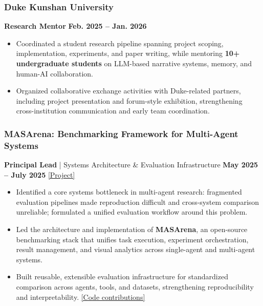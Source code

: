 \documentclass[10pt,a4paper]{article}
\begin{document}
    \subsubsection*{\color{itemcolor}Duke Kunshan University}
    \noindent\textbf{\color{sectioncolor}Research Mentor} \hfill \color{accentcolor}\textbf{Feb. 2025 -- Jan. 2026}
    \begin{itemize}[leftmargin=*, label=\textcolor{accentcolor}{\textbullet}, itemsep=0.2em]
        \item Coordinated a student research pipeline spanning project scoping, implementation, experiments, and paper writing, while mentoring \textbf{10+ undergraduate students} on LLM-based narrative systems, memory, and human-AI collaboration.
        \item Organized collaborative exchange activities with Duke-related partners, including project presentation and forum-style exhibition, strengthening cross-institution communication and early team coordination.
    \end{itemize}
    \subsubsection*{\color{itemcolor}MASArena: Benchmarking Framework for Multi-Agent Systems}
    \noindent\textbf{\color{sectioncolor}Principal Lead} | Systems Architecture \& Evaluation Infrastructure \hfill \color{accentcolor}\textbf{May 2025 -- July 2025}
    \noindent\href{https://github.com/LINs-lab/MASArena}{\color{linkcolor}[Project]} 
    \begin{itemize}[leftmargin=*, label=\textcolor{accentcolor}{\textbullet}, itemsep=0.2em]
        \item Identified a core systems bottleneck in multi-agent research: fragmented evaluation pipelines made reproduction difficult and cross-system comparison unreliable; formulated a unified evaluation workflow around this problem.
        \item Led the architecture and implementation of \textbf{MASArena}, an open-source benchmarking stack that unifies task execution, experiment orchestration, result management, and visual analytics across single-agent and multi-agent systems.
        \item Built reusable, extensible evaluation infrastructure for standardized comparison across agents, tools, and datasets, strengthening reproducibility and interpretability. \href{https://github.com/LINs-lab/MASArena/graphs/contributors}{\color{linkcolor}[Code contributions]}
    \end{itemize}
\end{document}
